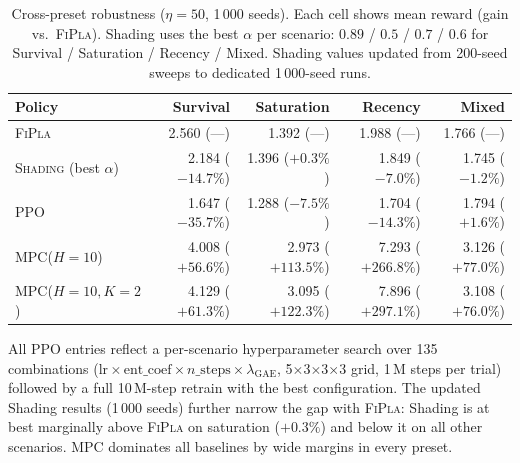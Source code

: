 \documentclass[11pt]{article}
\begin{document}
\begin{table}[h!]
\centering
\small
\caption{Cross-preset robustness ($\eta{=}50$, 1\,000 seeds).
         Each cell shows mean reward (gain vs.\ \textsc{FiPla}).
         Shading uses the best $\alpha$ per scenario:
         $0.89$ / $0.5$ / $0.7$ / $0.6$ for
         Survival / Saturation / Recency / Mixed.
         Shading values updated from 200-seed sweeps to dedicated 1\,000-seed runs.}
\label{tab:robustness}
\begin{tabular}{lrrrr}
\toprule
Policy & Survival & Saturation & Recency & Mixed \\
\midrule
\textsc{FiPla}
  & 2.560 ({---})
  & 1.392 ({---})
  & 1.988 ({---})
  & 1.766 ({---}) \\
\midrule
\textsc{Shading} (best $\alpha$)
  & 2.184 ($-14.7\%$)
  & 1.396 ($+0.3\%$)
  & 1.849 ($-7.0\%$)
  & 1.745 ($-1.2\%$) \\
\textsc{PPO}
  & 1.647 ($-35.7\%$)
  & 1.288 ($-7.5\%$)
  & 1.704 ($-14.3\%$)
  & 1.794 ($+1.6\%$) \\
\midrule
\textsc{MPC}($H{=}10$)
  & 4.008 ($+56.6\%$)
  & 2.973 ($+113.5\%$)
  & 7.293 ($+266.8\%$)
  & 3.126 ($+77.0\%$) \\
\textsc{MPC}($H{=}10,K{=}2$)
  & 4.129 ($+61.3\%$)
  & 3.095 ($+122.3\%$)
  & 7.896 ($+297.1\%$)
  & 3.108 ($+76.0\%$) \\
\bottomrule
\end{tabular}
\end{table}

All \textsc{PPO} entries reflect a per-scenario hyperparameter search over 135 combinations
($\mathrm{lr} \times \mathrm{ent\_coef} \times n\_\mathrm{steps} \times \lambda_\mathrm{GAE}$,
5$\times$3$\times$3$\times$3 grid, 1\,M steps per trial) followed by a full 10\,M-step retrain
with the best configuration.
The updated Shading results (1\,000 seeds) further narrow the gap with \textsc{FiPla}:
Shading is at best marginally above \textsc{FiPla} on saturation ($+0.3\%$) and below it on
all other scenarios.  MPC dominates all baselines by wide margins in every preset.
\end{document}
